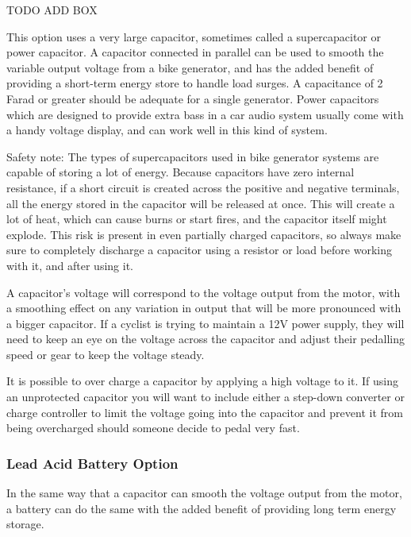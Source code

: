 \documentclass{article}
\theoremstyle{definition}
\theoremstyle{definition}
\theoremstyle{remark}
\begin{document}
      TODO ADD BOX

      This option uses a very large capacitor, sometimes called a supercapacitor or power capacitor. A capacitor connected in parallel can be used to smooth the variable output voltage from a bike generator, and has the added benefit of providing a short-term energy store to handle load surges. A capacitance of 2 Farad or greater should be adequate for a single generator. Power capacitors which are designed to provide extra bass in a car audio system usually come with a handy voltage display, and can work well in this kind of system.

      Safety note: The types of supercapacitors used in bike generator systems are capable of storing a lot of energy. Because capacitors have zero internal resistance, if a short circuit is created across the positive and negative terminals, all the energy stored in the capacitor will be released at once. This will create a lot of heat, which can cause burns or start fires, and the capacitor itself might explode. This risk is present in even partially charged capacitors, so always make sure to completely discharge a capacitor using a resistor or load before working with it, and after using it.

      A capacitor’s voltage will correspond to the voltage output from the motor, with a smoothing effect on any variation in output that will be more pronounced with a bigger capacitor. If a cyclist is trying to maintain a 12V power supply, they will need to keep an eye on the voltage across the capacitor and adjust their pedalling speed or gear to keep the voltage steady.

      It is possible to over charge a capacitor by applying a high voltage to it. If using an unprotected capacitor you will want to include either a step-down converter or charge controller to limit the voltage going into the capacitor and prevent it from being overcharged should someone decide to pedal very fast.
    

    \subsubsection*{Lead Acid Battery Option} %
    \label{ssub:lead_acid_battery_option}

      In the same way that a capacitor can smooth the voltage output from the motor, a battery can do the same with the added benefit of providing long term energy storage.
\end{document}
